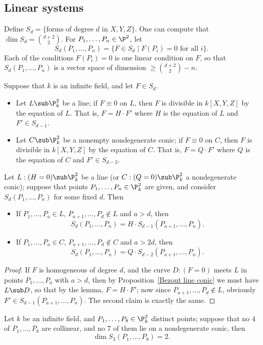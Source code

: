 \subsection{Linear systems}
Define $S_d=\{\text{forms of degree $d$ in $X,Y,Z$}\}$. One can compute that $\dim S_d=\binom{d+2}{2}$. For $P_1,\dots,P_n\in\P^2$, let
\[S_d(P_1,\dots,P_n)=\{F\in S_d\mid F(P_i)=0\text{ for all $i$}\}.\]
Each of the conditions $F(P_i)=0$ is one linear condition on $F$, so that $S_d(P_1,\dots,P_n)$ is a vector space of dimension $\geq\binom{d+2}{2}-n$.
\begin{lemma}
Suppose that $k$ is an infinite field, and let $F\in S_d$.
\begin{itemize}
\item Let $L\sub\P^2_k$ be a line; if $F\equiv0$ on $L$, then $F$ is divisible in $k[X,Y,Z]$ by the equation of $L$. That is, $F=H\cdot F'$ where $H$ is the equation of $L$ and $F'\in S_{d-1}$.
\item Let $C\sub\P^2_k$ be a nonempty nondegenerate conic; if $F\equiv 0$ on $C$, then $F$ is divisible in $k[X,Y,Z]$ by the equation of $C$. That is, $F=Q\cdot F'$ where $Q$ is the equation of $C$ and $F'\in S_{d-2}$.
\end{itemize}
\end{lemma}
\begin{corollary}\label{linear sys split coro}
Let $L:(H=0)\sub\P^2_k$ be a line (or $C:(Q=0)\sub\P^2_k$ a nondegenerate conic); suppose that points $P_1,\dots,P_{n}\in\P^2_k$ are given, and consider $S_d(P_1,\dots,P_n)$ for some fixed $d$. Then
\begin{itemize}
\item If $P_1,\dots,P_a\in L$, $P_{a+1},\dots,P_d\notin L$ and $a>d$, then
\[S_d(P_1,\dots,P_n)=H\cdot S_{d-1}(P_{a+1},\dots,P_n).\]
\item If $P_1,\dots,P_a\in C$, $P_{a+1},\dots,P_d\notin C$ and $a>2d$, then
\[S_d(P_1,\dots,P_n)=Q\cdot S_{d-2}(P_{a+1},\dots,P_n).\]
\end{itemize}
\end{corollary}
\begin{proof}
If $F$ is homogeneous of degree $d$, and the curve $D:(F=0)$ meets $L$ in points $P_1,\dots,P_a$ with $a>d$, then by Proposition~\ref{Bezout line conic} we must have $L\sub D$, so that by the lemma, $F=H\cdot F'$; now since $P_{a+1},\dots,P_d\notin L$, obviously $F'\in S_{d-1}(P_{a+1},\dots,P_n)$. The second claim is exactly the same.
\end{proof}
\begin{proposition}\label{cubic 8 point}
Let $k$ be an infinite field, and $P_1,\dots,P_8\in\P^2_k$ distinct points; suppose that no $4$ of $P_1,\dots,P_8$ are collinear, and no $7$ of them lie on a nondegenerate conic, then
\[\dim S_3(P_1,\dots,P_8)=2.\]
\end{proposition}
